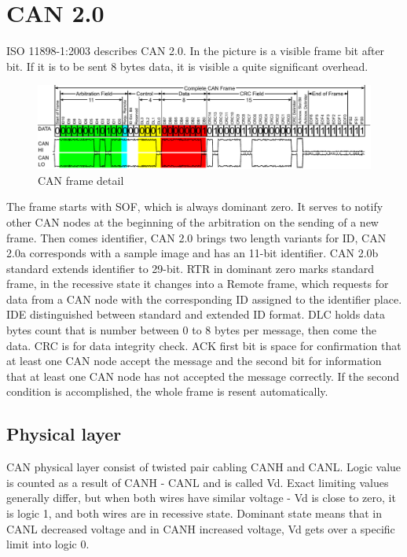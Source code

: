 \documentclass{ctuthesis}
\begin{document}
 \section{CAN 2.0}
  ISO 11898-1:2003 describes CAN 2.0. In the picture is a visible frame bit after bit. If it is to be sent 8 bytes data, it is visible a quite significant overhead. 
  \begin{figure}[H]
  \includegraphics[width=1\textwidth]{CAN-Bus-frame_in_base_format_without_stuffbits}
  \caption{CAN frame detail \cite{can_frame}}
  \end{figure}
  The frame starts with SOF, which is always dominant zero. It serves to notify other CAN nodes at the beginning of the arbitration on the sending of a new frame. Then comes identifier, CAN 2.0 brings two length variants for ID, CAN 2.0a corresponds with a sample image and has an 11-bit identifier. CAN 2.0b standard extends identifier to 29-bit. RTR in dominant zero marks standard frame, in the recessive state it changes into a Remote frame, which requests for data from a CAN node with the corresponding ID assigned to the identifier place. IDE distinguished between standard and extended ID format. DLC holds data bytes count that is number between 0 to 8 bytes per message, then come the data. CRC is for data integrity check. ACK first bit is space for confirmation that at least one CAN node accept the message and the second bit for information that at least one CAN node has not accepted the message correctly. If the second condition is accomplished, the whole frame is resent automatically.
  \subsection{Physical layer}
   CAN physical layer consist of twisted pair cabling CANH and CANL. Logic value is counted as a result of CANH - CANL and is called Vd\cite{can_Vd}. Exact limiting values generally differ, but when both wires have similar voltage - Vd is close to zero, it is logic 1, and both wires are in recessive state. Dominant state means that in CANL decreased voltage and in CANH increased voltage, Vd gets over a specific limit into logic 0.
\end{document}
